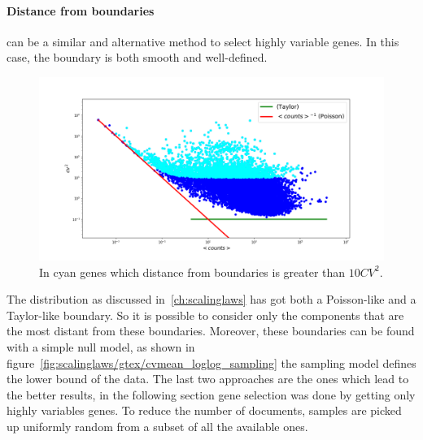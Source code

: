 \paragraph{Distance from boundaries} can be a similar and alternative method to select highly variable genes. In this case, the boundary is both smooth and well-defined.
\begin{figure}[htb!]
    \centering
    \includegraphics[width=0.8\linewidth]{pictures/topic/cvmean_oversampling.png}
    \caption{In \textcolor{pythoncyan}{cyan} genes which distance from boundaries is greater than $10 CV^2$.}
    \label{fig:topic/cvmean_oversampling}
\end{figure}
The distribution as discussed in~\ref{ch:scalinglaws} has got both a Poisson-like and a Taylor-like boundary. So it is possible to consider only the components that are the most distant from these boundaries. Moreover, these boundaries can be found with a simple null model, as shown in figure~\ref{fig:scalinglaws/gtex/cvmean_loglog_sampling} the sampling model defines the lower bound of the data.
\FloatBarrier
The last two approaches are the ones which lead to the better results, in the following section gene selection was done by getting only highly variables genes.
To reduce the number of documents, samples are picked up uniformly random from a subset of all the available ones.